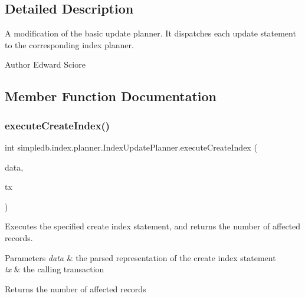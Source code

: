 \subsection{Detailed Description}
A modification of the basic update planner. It dispatches each update statement to the corresponding index planner. \begin{DoxyAuthor}{Author}
Edward Sciore 
\end{DoxyAuthor}


\subsection{Member Function Documentation}
\mbox{\label{classsimpledb_1_1index_1_1planner_1_1IndexUpdatePlanner_ad743dd19ed44d8b11338ddcd49bf861a}} 
\subsubsection{\texorpdfstring{execute\+Create\+Index()}{executeCreateIndex()}}
{\footnotesize\ttfamily int simpledb.\+index.\+planner.\+Index\+Update\+Planner.\+execute\+Create\+Index (\begin{DoxyParamCaption}\item[{\hyperlink{classsimpledb_1_1parse_1_1CreateIndexData}{Create\+Index\+Data}}]{data,  }\item[{\hyperlink{classsimpledb_1_1tx_1_1Transaction}{Transaction}}]{tx }\end{DoxyParamCaption})\hspace{0.3cm}{\ttfamily [inline]}}

Executes the specified create index statement, and returns the number of affected records. 
\begin{DoxyParams}{Parameters}
{\em data} & the parsed representation of the create index statement \\
\hline
{\em tx} & the calling transaction \\
\hline
\end{DoxyParams}
\begin{DoxyReturn}{Returns}
the number of affected records 
\end{DoxyReturn}


